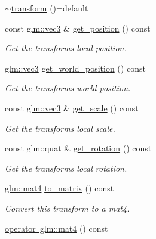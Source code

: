 \begin{DoxyCompactItemize}
\item 
\mbox{\hyperlink{classmoka_1_1transform_a4469fa3b4f998c8c008e2ca02fc54944}{$\sim$transform}} ()=default
\item 
const \mbox{\hyperlink{namespacemoka_aed2224bc0e5b79e57a8975ded94ee1aaa97ade28e93c0de60adc075bdbe07ca36}{glm\+::vec3}} \& \mbox{\hyperlink{classmoka_1_1transform_aa14faed346ff209df8181a6d75bd1654}{get\+\_\+position}} () const
\begin{DoxyCompactList}\small\item\em Get the transform\textquotesingle{}s local position. \end{DoxyCompactList}\item 
\mbox{\hyperlink{namespacemoka_aed2224bc0e5b79e57a8975ded94ee1aaa97ade28e93c0de60adc075bdbe07ca36}{glm\+::vec3}} \mbox{\hyperlink{classmoka_1_1transform_a1be839aea05acb7c03a393a3b9f9d776}{get\+\_\+world\+\_\+position}} () const
\begin{DoxyCompactList}\small\item\em Get the transform\textquotesingle{}s world position. \end{DoxyCompactList}\item 
const \mbox{\hyperlink{namespacemoka_aed2224bc0e5b79e57a8975ded94ee1aaa97ade28e93c0de60adc075bdbe07ca36}{glm\+::vec3}} \& \mbox{\hyperlink{classmoka_1_1transform_a029e29caae092f78166cd208137aae18}{get\+\_\+scale}} () const
\begin{DoxyCompactList}\small\item\em Get the transform\textquotesingle{}s local scale. \end{DoxyCompactList}\item 
const glm\+::quat \& \mbox{\hyperlink{classmoka_1_1transform_a4bb68582d14ce69a418fceecc312a686}{get\+\_\+rotation}} () const
\begin{DoxyCompactList}\small\item\em Get the transform\textquotesingle{}s local rotation. \end{DoxyCompactList}\item 
\mbox{\hyperlink{namespacemoka_aed2224bc0e5b79e57a8975ded94ee1aaabe14b41eb96410ea28b32bc138d885ae}{glm\+::mat4}} \mbox{\hyperlink{classmoka_1_1transform_a01484fe05bd028cd37ceca8c1e95fbde}{to\+\_\+matrix}} () const
\begin{DoxyCompactList}\small\item\em Convert this transform to a mat4. \end{DoxyCompactList}\item 
\mbox{\hyperlink{classmoka_1_1transform_a0283f5129ddc7c7bc12561b330729b26}{operator glm\+::mat4}} () const

\end{DoxyCompactItemize}
